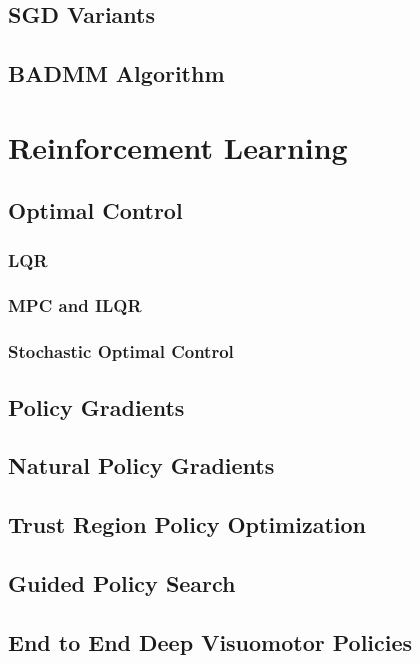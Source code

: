 \documentclass[12pt]{article}
\begin{document}
\subsection{SGD Variants}

\subsection{BADMM Algorithm}

\section{Reinforcement Learning}

\subsection{Optimal Control}

\subsubsection{LQR}

\subsubsection{MPC and ILQR}

\subsubsection{Stochastic Optimal Control}

\subsection{Policy Gradients}

\subsection{Natural Policy Gradients}

\subsection{Trust Region Policy Optimization}

\subsection{Guided Policy Search}

\subsection{End to End Deep Visuomotor Policies}
\end{document}
